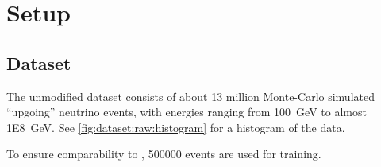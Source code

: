 \section{Setup}

\subsection{Dataset}
The unmodified dataset consists of about 13 million Monte-Carlo simulated \enquote{upgoing} neutrino events,
with energies ranging from \SI{100}{\giga\electronvolt} to almost \SI{1E8}{\giga\electronvolt}.
See \autoref{fig:dataset:raw:histogram} for a histogram of the data.

To ensure comparability to \cite{dsea_samuel},
\num{500000} events are used for training.
